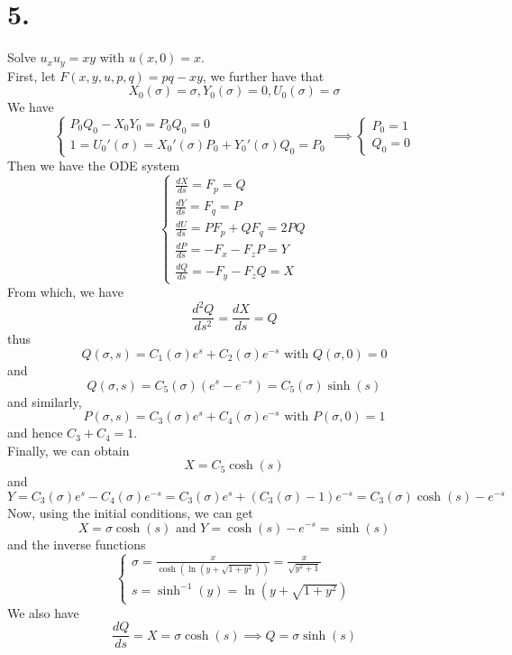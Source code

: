 \documentclass[11pt]{article}
\theoremstyle{mystyle}
\theoremstyle{definition}
\begin{document}
\section*{5.}
Solve $u_x u_y = xy$ with $u(x,0) = x$. \\
First, let $F(x,y,u,p,q) = pq - xy$, we further have that 
\begin{equation}
  X_0(\sigma) = \sigma, Y_0(\sigma) = 0, U_0(\sigma) = \sigma 
\end{equation}
We have 
\[
  \begin{cases}
    P_0Q_0 - X_0Y_0 = P_0 Q_0 = 0 \\
    1 = U_0'(\sigma) = X_0'(\sigma) P_0 + Y_0'(\sigma) Q_0 = P_0 
  \end{cases}
  \implies 
  \begin{cases}
    P_0 = 1 \\
    Q_0 = 0
  \end{cases}
\]
Then we have the ODE system 
\[
  \begin{cases}
    \displaystyle\frac{dX}{ds} = F_p = Q \\
    \displaystyle\frac{dY}{ds} = F_q = P \\
    \displaystyle\frac{dU}{ds} = PF_p + QF_q = 2PQ  \\
    \displaystyle\frac{dP}{ds} = -F_x - F_z P  =  Y  \\
    \displaystyle\frac{dQ}{ds} = -F_y - F_z Q = X  
  \end{cases}
\]
From which, we have
\[
  \displaystyle\frac{d^2Q}{ds^2} = \displaystyle\frac{dX}{ds} = Q 
\]
thus 
\[
  Q(\sigma, s) = C_1(\sigma) e^s + C_2(\sigma) e^{-s} \text{ with } Q(\sigma, 0) = 0
\]
and 
\[
  Q(\sigma, s) = C_5(\sigma)(e^s - e^{-s}) = C_5(\sigma) \sinh(s) 
\]
and similarly, 
\[
  P(\sigma, s) = C_3(\sigma) e^s + C_4(\sigma) e^{-s} \text{ with } P(\sigma, 0) = 1
\]
and hence $C_3 + C_4 = 1$. \\ 
Finally, we can obtain 
\[
  X = C_5\cosh(s)
\]
and 
\[
  Y = C_3(\sigma) e^s - C_4(\sigma) e^{-s} = C_3(\sigma) e^s + (C_3(\sigma) - 1) e^{-s} = C_3(\sigma)\cosh(s) - e^{-s}
\]
Now, using the initial conditions, we can get 
\[
  X = \sigma \cosh(s) \text{ and } Y = \cosh(s) - e^{-s} = \sinh(s)
\]
and the inverse functions
\[
  \begin{cases}
    \sigma = \displaystyle\frac{x}{\cosh(\ln(y + \sqrt{1+y^2}))} = \displaystyle\frac{x}{\sqrt{y^2+1}}\\
    s = \sinh^{-1}(y) = \ln(y + \sqrt{1 + y^2})
  \end{cases}
\]
We also have 
\[
  \displaystyle\frac{dQ}{ds} = X = \sigma\cosh(s) \implies Q = \sigma\sinh(s)
\]
\end{document}
